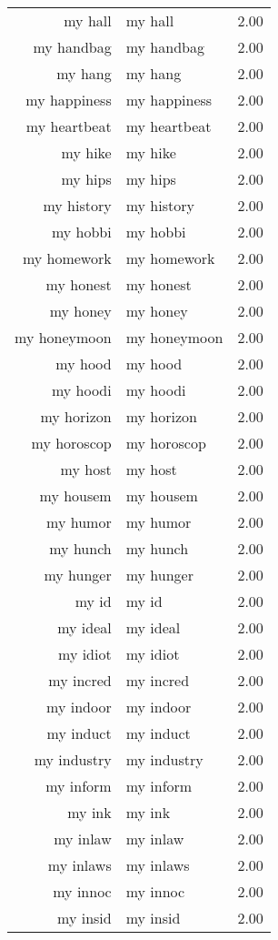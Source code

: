\begin{table}[ht]
\begin{tabular}{rlr}
  my hall & my hall & 2.00 \\ 
  my handbag & my handbag & 2.00 \\ 
  my hang & my hang & 2.00 \\ 
  my happiness & my happiness & 2.00 \\ 
  my heartbeat & my heartbeat & 2.00 \\ 
  my hike & my hike & 2.00 \\ 
  my hips & my hips & 2.00 \\ 
  my history & my history & 2.00 \\ 
  my hobbi & my hobbi & 2.00 \\ 
  my homework & my homework & 2.00 \\ 
  my honest & my honest & 2.00 \\ 
  my honey & my honey & 2.00 \\ 
  my honeymoon & my honeymoon & 2.00 \\ 
  my hood & my hood & 2.00 \\ 
  my hoodi & my hoodi & 2.00 \\ 
  my horizon & my horizon & 2.00 \\ 
  my horoscop & my horoscop & 2.00 \\ 
  my host & my host & 2.00 \\ 
  my housem & my housem & 2.00 \\ 
  my humor & my humor & 2.00 \\ 
  my hunch & my hunch & 2.00 \\ 
  my hunger & my hunger & 2.00 \\ 
  my id & my id & 2.00 \\ 
  my ideal & my ideal & 2.00 \\ 
  my idiot & my idiot & 2.00 \\ 
  my incred & my incred & 2.00 \\ 
  my indoor & my indoor & 2.00 \\ 
  my induct & my induct & 2.00 \\ 
  my industry & my industry & 2.00 \\ 
  my inform & my inform & 2.00 \\ 
  my ink & my ink & 2.00 \\ 
  my inlaw & my inlaw & 2.00 \\ 
  my inlaws & my inlaws & 2.00 \\ 
  my innoc & my innoc & 2.00 \\ 
  my insid & my insid & 2.00 \\ 

\end{tabular}
\end{table}
